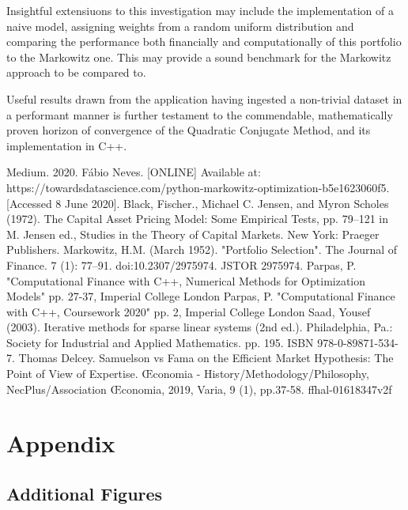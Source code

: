 \documentclass{article}
\begin{document}
Insightful extensiuons to this investigation may include the implementation of a naive model, assigning weights from a random uniform distribution and comparing the performance both financially and computationally of this portfolio to the Markowitz one. This may provide a sound benchmark for the Markowitz approach to be compared to.

Useful results drawn from the application having ingested a non-trivial dataset in a performant manner is further testament to the commendable, mathematically proven horizon of convergence of the Quadratic Conjugate Method, and its implementation in C++.



\newpage

\begin{thebibliography}{}
\label{sec:thebibliography}
	 Medium. 2020. Fábio Neves. [ONLINE] Available at: https://towardsdatascience.com/python-markowitz-optimization-b5e1623060f5. [Accessed 8 June 2020].
	 Black, Fischer., Michael C. Jensen, and Myron Scholes (1972). The Capital Asset Pricing Model: Some Empirical Tests, pp. 79–121 in M. Jensen ed., Studies in the Theory of Capital Markets. New York: Praeger Publishers.
	 Markowitz, H.M. (March 1952). "Portfolio Selection". The Journal of Finance. 7 (1): 77–91. doi:10.2307/2975974. JSTOR 2975974.
	 Parpas, P. "Computational Finance with C++, Numerical Methods for Optimization Models" pp. 27-37, Imperial College London
	 Parpas, P. "Computational Finance with C++, Coursework 2020" pp. 2, Imperial College London
	 Saad, Yousef (2003). Iterative methods for sparse linear systems (2nd ed.). Philadelphia, Pa.: Society for Industrial and Applied Mathematics. pp. 195. ISBN 978-0-89871-534-7.
	 Thomas Delcey. Samuelson vs Fama on the Efficient Market Hypothesis: The Point of View of Expertise. Œconomia - History/Methodology/Philosophy, NecPlus/Association Œconomia, 2019, Varia,
	9 (1), pp.37-58. ffhal-01618347v2f
	
	
	
\end{thebibliography} 



\section{Appendix} 
\label{sec:appendix}

\subsection{Additional Figures} 
\label{sec:add_figs}
\end{document}
